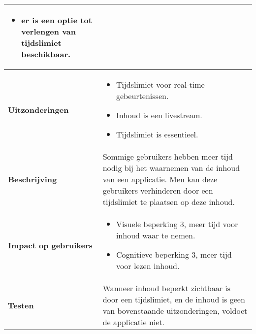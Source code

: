 \begin{table}[H]
\begin{tabular}{|l|p{12cm}|}
\begin{itemize}
            \item er is een optie tot verlengen van tijdslimiet beschikbaar.
        \end{itemize}                                                                                                                                                                   \\ 
        \hline
        \textbf{Uitzonderingen}     & 
        \begin{itemize}
            \item Tijdslimiet voor real-time gebeurtenissen.
            \item Inhoud is een livestream.
            \item Tijdslimiet is essentieel.
        \end{itemize}                                                                                                                                                                                                   \\ 
        \hline
        \textbf{Beschrijving}                 & Sommige gebruikers hebben meer tijd nodig bij het waarnemen van de inhoud van een applicatie. Men kan deze gebruikers verhinderen door een tijdslimiet te plaatsen op deze inhoud. \\ 
        \hline
        \textbf{Impact op gebruikers}         &  
        \begin{itemize}
            \item Visuele beperking 3, meer tijd voor inhoud waar te nemen.
            \item Cognitieve beperking 3, meer tijd voor lezen inhoud.
        \end{itemize}                                                                                                                                                                                                                                                                                                                                                                                                                    \\ 
        \hline
        \textbf{Testen}                       & Wanneer inhoud beperkt zichtbaar is door een tijdslimiet, en de inhoud is geen van bovenstaande uitzonderingen, voldoet de applicatie niet.                                                                                                                                                                                                                  \\
        \hline
    \end{tabular}
    
\end{table}

